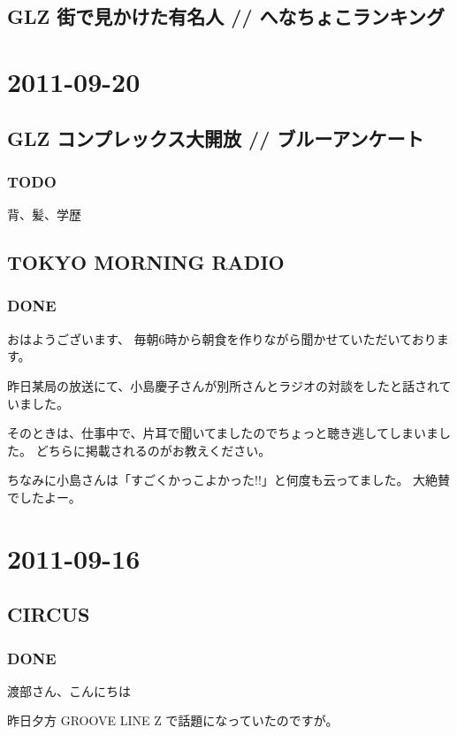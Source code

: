 \documentclass[11pt]{article}
\begin{document}
\subsection{GLZ 街で見かけた有名人 // へなちょこランキング}
\label{sec-67_1}
\section{2011-09-20}
\label{sec-68}
\subsection{GLZ コンプレックス大開放 // ブルーアンケート}
\label{sec-68_1}
\subsubsection{\textbf{TODO}}
\label{sec-68_1_1}

背、髪、学歴
\subsection{TOKYO MORNING RADIO}
\label{sec-68_2}
\subsubsection{\textbf{DONE}}
\label{sec-68_2_1}

おはようございます、
毎朝6時から朝食を作りながら聞かせていただいております。

昨日某局の放送にて、小島慶子さんが別所さんとラジオの対談をしたと話されていました。

そのときは、仕事中で、片耳で聞いてましたのでちょっと聴き逃してしまいました。
どちらに掲載されるのがお教えください。

ちなみに小島さんは「すごくかっこよかった!!」と何度も云ってました。
大絶賛でしたよー。
\section{2011-09-16}
\label{sec-69}
\subsection{CIRCUS}
\label{sec-69_1}
\subsubsection{\textbf{DONE}}
\label{sec-69_1_1}

渡部さん、こんにちは

昨日夕方 GROOVE LINE Z で話題になっていたのですが。
\end{document}

